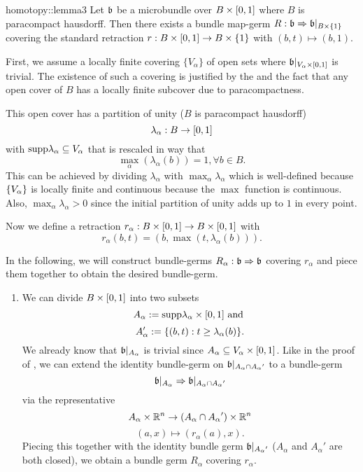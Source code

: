 \begin{scope}
    \newcommand{\A} {
        A_\alpha{}
    }

    \begin{mylemma}{homotopy::lemma3}
        Let $\mathfrak{b}$ be a microbundle over $B \times{} [0, 1]$ where $B$ is paracompact hausdorff.
        Then there exists a bundle map-germ $R: \mathfrak{b} \Rightarrow{} \mathfrak{b}\vert_{B \times{} \{1\}}$
        covering the standard retraction $r: B \times{} [0, 1] \to B \times{} \{1\}$ with $(b, t) \mapsto (b, 1)$.
    \end{mylemma}

    \begin{myproof}
        First, we assume a locally finite covering $\{V_\alpha\}$ of open sets where $\mathfrak{b}\vert_{V_\alpha \times{} [0, 1]}$ is trivial.
        The existence of such a covering is justified by the  and
        the fact that any open cover of $B$ has a locally finite subcover due to paracompactness.

        This open cover has a partition of unity ($B$ is paracompact hausdorff) 
        \[ \lambda_\alpha: B \to [0, 1] \]
        with $\text{supp} \lambda_\alpha \subseteq{} V_\alpha$ that is rescaled in way that
        \[ \max_\alpha(\lambda_\alpha(b)) = 1, \forall b \in B. \]
        This can be achieved by dividing $\lambda_\alpha$ with $\max_\alpha \lambda_\alpha$
        which is well-defined because $\{V_\alpha\}$ is locally finite and continuous because the $\max$ function is continuous.
        Also, $\max_\alpha \lambda_\alpha > 0$ since the initial partition of unity adds up to $1$ in every point.

        Now we define a retraction $r_\alpha: B \times{} [0, 1] \to B \times{} [0, 1]$ with
        \[ r_\alpha(b, t) = (b, \max(t, \lambda_\alpha(b))). \]

        In the following, we will construct bundle-germs $R_\alpha: \mathfrak{b} \Rightarrow{} \mathfrak{b}$ covering $r_\alpha$
        and piece them together to obtain the desired bundle-germ.
        \begin{enumerate}
            \item 
            We can divide $B \times [0, 1]$ into two subsets
            \[ A_\alpha := \text{supp}{\lambda_\alpha} \times{} [0, 1] \text{ and } \]
            \[ A'_\alpha := \{(b, t):t \ge \lambda_\alpha(b)\}. \]
            We already know that $\mathfrak{b}\vert_{A_\alpha}$ is trivial since $A_\alpha \subseteq{} V_\alpha \times{} [0, 1]$.
            Like in the proof of , we can extend the identity bundle-germ on $\bb\restr{\A \cap \A'}$ to a bundle-germ
            \[ \germ{\bb\restr{\A}}{\bb\restr{\A \cap \A'}} \]
            via the representative
            \[ \A \times \R^n \to (\A \cap \A') \times \R^n\]
            \[ (a, x) \mapsto (r_\alpha(a), x). \]
            Piecing this together with the identity bundle germ $\bb\restr{\A'}$ ($\A$ and $\A'$ are both closed), we obtain a bundle germ $R_\alpha$ covering $r_\alpha$.
            

\end{enumerate}
\end{myproof}
\end{scope}
